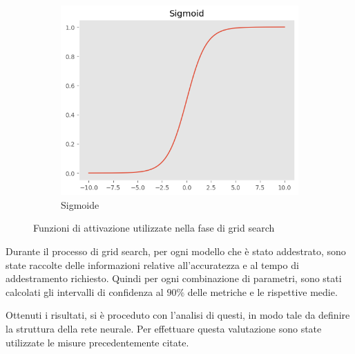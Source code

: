 \begin{figure}[!ht]
    \hfill
    \begin{subfigure}[b]{0.3\textwidth}
        \centering
        \includegraphics[width=\textwidth]{img/rete/sigmoid.png}
        \caption{Sigmoide}
        \label{fig:sigmoid}
    \end{subfigure}
    \caption{Funzioni di attivazione utilizzate nella fase di grid search}
    \label{fig:}
\end{figure}

Durante il processo di grid search, per ogni modello che è stato addestrato, sono
state raccolte delle informazioni relative all'accuratezza e al tempo di addestramento
richiesto. Quindi per ogni combinazione di parametri, sono stati calcolati gli
intervalli di confidenza al $90\%$ delle metriche e le rispettive medie.

Ottenuti i risultati, si è proceduto con l'analisi di questi, in modo tale da
definire la struttura della rete neurale. Per effettuare questa valutazione sono
state utilizzate le misure precedentemente citate.

